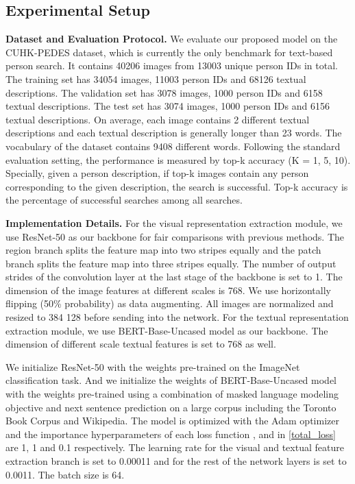 \documentclass[final]{cvpr}
\begin{document}
\subsection{Experimental Setup}
\textbf{Dataset and Evaluation Protocol.} We evaluate our proposed model on the CUHK-PEDES dataset, which is currently the only benchmark for text-based person search.
It contains 40206 images from 13003 unique person IDs in total. 
The training set has 34054 images, 11003 person IDs and 68126 textual descriptions. 
The validation set has 3078 images, 1000 person IDs and 6158 textual descriptions. 
The test set has 3074 images, 1000 person IDs and 6156 textual descriptions. 
On average, each image contains 2 different textual descriptions and each textual description is generally longer than 23 words. 
The vocabulary of the dataset contains 9408 different words.
Following the standard evaluation setting, the performance is measured by top-k accuracy (K = 1, 5, 10). Specially, given a person description, if top-k images contain any person corresponding to the given description, the search is successful. Top-k accuracy is the percentage of successful searches among all searches.


\textbf{Implementation Details.} For the visual representation extraction module, we use ResNet-50 as our backbone for fair comparisons with previous methods. The region branch splits the feature map into two stripes equally and the patch branch splits the feature map into three stripes equally.  
The number of output strides of the convolution layer at the last stage of the backbone is set to 1.
The dimension  of the image features at different scales is 768.  
We use horizontally flipping (50\% probability) as data augmenting. 
All images are normalized and resized to 384  128 before sending into the network. 
For the textual representation extraction module, we use BERT-Base-Uncased model as our backbone. 
The dimension  of different scale textual features is set to 768 as well. 

We initialize ResNet-50 with the weights pre-trained on the ImageNet classification task. And we initialize the weights of BERT-Base-Uncased model with the weights pre-trained using a combination of masked language modeling objective and next sentence prediction on a large corpus including the Toronto Book Corpus and Wikipedia. 
The model is optimized with the Adam \cite{kingma2014adam} optimizer and the importance hyperparameters of each loss function ,  and  in \ref{total_loss} are 1, 1 and 0.1 respectively.
The learning rate for the visual and textual feature extraction branch is set to 0.00011 and for the rest of the network layers is set to 0.0011. The batch size is 64.
\end{document}
